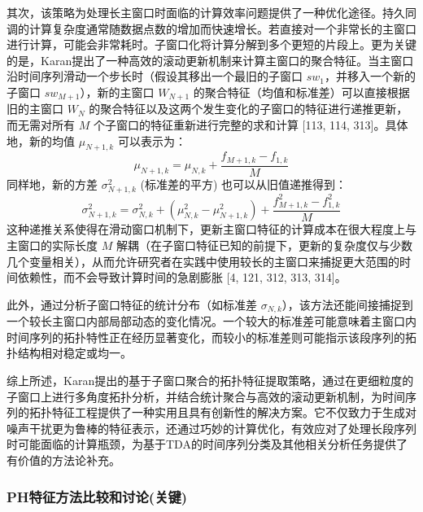         其次，该策略为处理长主窗口时面临的计算效率问题提供了一种优化途径。持久同调的计算复杂度通常随数据点数的增加而快速增长。若直接对一个非常长的主窗口进行计算，可能会非常耗时。子窗口化将计算分解到多个更短的片段上。更为关键的是，Karan提出了一种高效的滚动更新机制来计算主窗口的聚合特征。当主窗口沿时间序列滑动一个步长时（假设其移出一个最旧的子窗口 $sw_1$，并移入一个新的子窗口 $sw_{M+1}$），新的主窗口 $W_{N+1}$ 的聚合特征（均值和标准差）可以直接根据旧的主窗口 $W_N$ 的聚合特征以及这两个发生变化的子窗口的特征进行递推更新，而无需对所有 $M$ 个子窗口的特征重新进行完整的求和计算 [113, 114, 313]。具体地，新的均值 $\mu_{N+1,k}$ 可以表示为：
        \begin{equation}
            \mu_{N+1,k} = \mu_{N,k} + \frac{f_{M+1,k} - f_{1,k}}{M}
            \label{eq:recursive_mean}
        \end{equation}
        同样地，新的方差 $\sigma_{N+1,k}^2$ (标准差的平方) 也可以从旧值递推得到：
        \begin{equation}
            \sigma_{N+1,k}^2 = \sigma_{N,k}^2 + (\mu_{N,k}^2 - \mu_{N+1,k}^2) + \frac{f_{M+1,k}^2 - f_{1,k}^2}{M}
            \label{eq:recursive_variance}
        \end{equation}
        这种递推关系使得在滑动窗口机制下，更新主窗口特征的计算成本在很大程度上与主窗口的实际长度 $M$ 解耦（在子窗口特征已知的前提下，更新的复杂度仅与少数几个变量相关），从而允许研究者在实践中使用较长的主窗口来捕捉更大范围的时间依赖性，而不会导致计算时间的急剧膨胀 [4, 121, 312, 313, 314]。
        
        此外，通过分析子窗口特征的统计分布（如标准差 $\sigma_{N,k}$），该方法还能间接捕捉到一个较长主窗口内部局部动态的变化情况。一个较大的标准差可能意味着主窗口内时间序列的拓扑特性正在经历显著变化，而较小的标准差则可能指示该段序列的拓扑结构相对稳定或均一。
        
        综上所述，Karan提出的基于子窗口聚合的拓扑特征提取策略，通过在更细粒度的子窗口上进行多角度拓扑分析，并结合统计聚合与高效的滚动更新机制，为时间序列的拓扑特征工程提供了一种实用且具有创新性的解决方案。它不仅致力于生成对噪声干扰更为鲁棒的特征表示，还通过巧妙的计算优化，有效应对了处理长段序列时可能面临的计算瓶颈，为基于TDA的时间序列分类及其他相关分析任务提供了有价值的方法论补充。
        
        \subsubsection{PH特征方法比较和讨论(关键)}
            \label{sec:tda_features_discussion}

